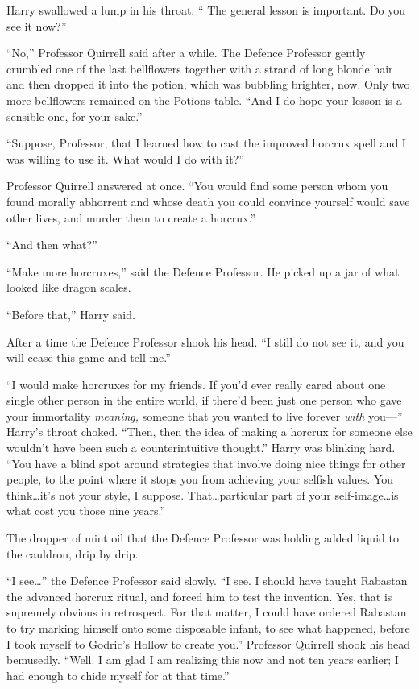 Harry swallowed a lump in his throat. “ The general lesson is important. Do you see it now?”

“No,” Professor Quirrell said after a while. The Defence Professor gently crumbled one of the last bellflowers together with a strand of long blonde hair and then dropped it into the potion, which was bubbling brighter, now. Only two more bellflowers remained on the Potions table. “And I do hope your lesson is a sensible one, for your sake.”

“Suppose, Professor, that I learned how to cast the improved horcrux spell and I was willing to use it. What would I do with it?”

Professor Quirrell answered at once. “You would find some person whom you found morally abhorrent and whose death you could convince yourself would save other lives, and murder them to create a horcrux.”

“And then what?”

“Make more horcruxes,” said the Defence Professor. He picked up a jar of what looked like dragon scales.

“Before that,” Harry said.

After a time the Defence Professor shook his head. “I still do not see it, and you will cease this game and tell me.”

“I would make horcruxes for my friends. If you’d ever really cared about one single other person in the entire world, if there’d been just one person who gave your immortality \emph{meaning,} someone that you wanted to live forever \emph{with} you—” Harry’s throat choked. “Then, then the idea of making a horcrux for someone else wouldn’t have been such a counterintuitive thought.” Harry was blinking hard. “You have a blind spot around strategies that involve doing nice things for other people, to the point where it stops you from achieving your selfish values. You think…it’s not your style, I suppose. That…particular part of your self-image…is what cost you those nine years.”

The dropper of mint oil that the Defence Professor was holding added liquid to the cauldron, drip by drip.

“I see…” the Defence Professor said slowly. “I see. I should have taught Rabastan the advanced horcrux ritual, and forced him to test the invention. Yes, that is supremely obvious in retrospect. For that matter, I could have ordered Rabastan to try marking himself onto some disposable infant, to see what happened, before I took myself to Godric’s Hollow to create you.” Professor Quirrell shook his head bemusedly. “Well. I am glad I am realizing this now and not ten years earlier; I had enough to chide myself for at that time.”

